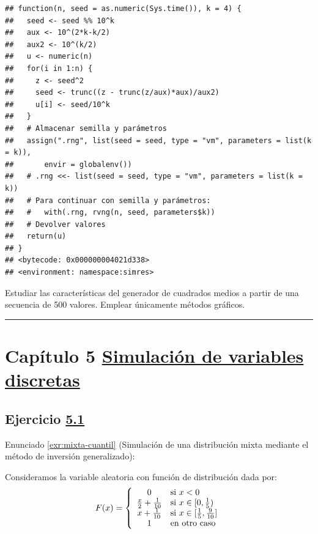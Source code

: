 \documentclass[
]{book}
\theoremstyle{break}
\theoremstyle{nonumberplain}
\begin{document}
\begin{verbatim}
## function(n, seed = as.numeric(Sys.time()), k = 4) {
##   seed <- seed %% 10^k
##   aux <- 10^(2*k-k/2)
##   aux2 <- 10^(k/2)
##   u <- numeric(n)
##   for(i in 1:n) {
##     z <- seed^2
##     seed <- trunc((z - trunc(z/aux)*aux)/aux2)
##     u[i] <- seed/10^k
##   }
##   # Almacenar semilla y parámetros
##   assign(".rng", list(seed = seed, type = "vm", parameters = list(k = k)),
##       envir = globalenv())
##   # .rng <<- list(seed = seed, type = "vm", parameters = list(k = k))
##   # Para continuar con semilla y parámetros:
##   #   with(.rng, rvng(n, seed, parameters$k))
##   # Devolver valores
##   return(u)
## }
## <bytecode: 0x000000004021d338>
## <environment: namespace:simres>
\end{verbatim}

Estudiar las características del generador de cuadrados medios a partir de una secuencia de 500 valores.
Emplear únicamente métodos gráficos.

\begin{center}\rule{0.5\linewidth}{0.5pt}\end{center}

\hypertarget{capuxedtulo-5-simulaciuxf3n-de-variables-discretas}{%
\section{\texorpdfstring{Capítulo 5 \href{discretas.html}{Simulación de variables discretas}}{Capítulo 5 Simulación de variables discretas}}\label{capuxedtulo-5-simulaciuxf3n-de-variables-discretas}}

\hypertarget{sol-mixta-cuantil}{%
\subsection{\texorpdfstring{Ejercicio \href{ejercicios-discretas.html\#exr:mixta-cuantil}{5.1}}{Ejercicio 5.1}}\label{sol-mixta-cuantil}}

Enunciado \ref{exr:mixta-cuantil} (Simulación de una distribución mixta mediante el método de inversión generalizado):

Consideramos la variable aleatoria con función de distribución dada por:
\[F(x)=\left\{
\begin{array}
[c]{cl}0 & \mbox{si $x<0$}\\
\frac{x}{2}+\frac{1}{10} & \mbox{si $x\in[0,\frac{1}{5})$}\\
x+\frac{1}{10} & \mbox{si $x\in[\frac{1}{5},\frac{9}{10}]$}\\
1 & \mbox{en otro caso}
\end{array}
\right.\]
\end{document}
